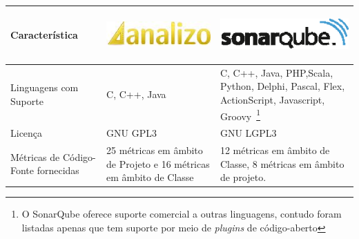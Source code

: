 \begin{savenotes}
\begin{table}[!ht]
\centering
\begin{tabular}{|p{5cm}|p{4.5cm}|p{5cm}|}
\hline

Característica 

&

\begin{center}
\includegraphics[keepaspectratio=true,scale=0.48]{figuras/analizo.eps} 
\end{center}


&



\begin{center}
\includegraphics[keepaspectratio=true,scale=0.48]{figuras/sonarqube.eps} 
\end{center}





   
\\ \hline


Linguagens com Suporte  & C, C++, Java & C, C++, Java, PHP,Scala, Python, Delphi, Pascal, Flex, ActionScript, Javascript, Groovy~\footnote{O SonarQube oferece suporte comercial a outras linguagens, contudo foram listadas apenas que tem suporte por meio de \textit{plugins} de código-aberto} \\ \hline
Licença  & GNU GPL3 & GNU LGPL3  \\ \hline




Métricas de Código-Fonte fornecidas  & 25 métricas em âmbito de Projeto e 16  métricas em âmbito de Classe \cite{Meirelles2013} & 12 métricas em âmbito de Classe, 8 métricas em âmbito de projeto. \\ \hline



\end{tabular}
\end{table}
\end{savenotes}
